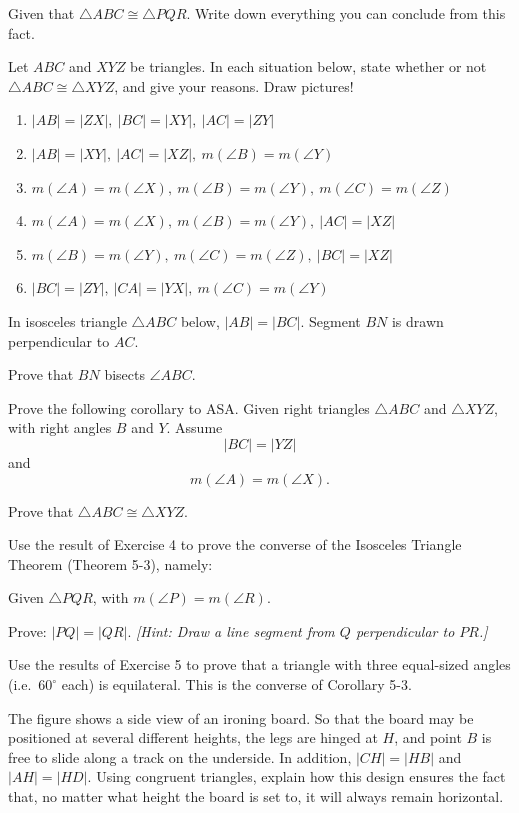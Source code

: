 \documentclass[12pt]{book} %
\begin{document}
\setcounter{Exercise}{0}
\begin{ExerciseList}
\Exercise Given that $\triangle ABC\cong\triangle PQR$. Write down everything you can conclude from this fact.

\Exercise Let $ABC$ and $XYZ$ be triangles. In each situation below, state whether or not $\triangle ABC\cong\triangle XYZ$, and give your reasons. Draw pictures!
\begin{enumerate}
\item[(a)] $|AB|=|ZX|,\ |BC|=|XY|,\ |AC|=|ZY|$
\item[(b)] $|AB|=|XY|,\ |AC|=|XZ|,\ m(\angle B)=m(\angle Y)$
\item[(c)] $m(\angle A)=m(\angle X),\ m(\angle B)=m(\angle Y),\ m(\angle C)=m(\angle Z)$
\item[(d)] $m(\angle A)=m(\angle X),\ m(\angle B)=m(\angle Y),\ |AC|=|XZ|$
\item[(e)] $m(\angle B)=m(\angle Y),\ m(\angle C)=m(\angle Z),\ |BC|=|XZ|$
\item[(f)] $|BC|=|ZY|,\ |CA|=|YX|,\ m(\angle C)=m(\angle Y)$
\end{enumerate}

\Exercise In isosceles triangle $\triangle ABC$ below, $|AB|=|BC|$. Segment $BN$ is drawn perpendicular to $AC$.


Prove that $BN$ bisects $\angle ABC$.

\Exercise Prove the following corollary to ASA. Given right triangles $\triangle ABC$ and $\triangle XYZ$, with right angles $B$ and $Y$. Assume
\[
|BC|=|YZ|
\]
and
\[
m(\angle A)=m(\angle X).
\]


Prove that $\triangle ABC\cong\triangle XYZ$.

\Exercise Use the result of Exercise 4 to prove the converse of the Isosceles Triangle Theorem (Theorem 5-3), namely:

Given $\triangle PQR$, with $m(\angle P)=m(\angle R)$.


Prove: $|PQ|=|QR|$. \textit{[Hint: Draw a line segment from $Q$ perpendicular to $PR$.]}

\Exercise Use the results of Exercise 5 to prove that a triangle with three equal-sized angles (i.e.\ $60^\circ$ each) is equilateral. This is the converse of Corollary 5-3.

\Exercise The figure shows a side view of an ironing board. So that the board may be positioned at several different heights, the legs are hinged at $H$, and point $B$ is free to slide along a track on the underside. In addition, $|CH|=|HB|$ and $|AH|=|HD|$. Using congruent triangles, explain how this design ensures the fact that, no matter what height the board is set to, it will always remain horizontal.


\end{ExerciseList}
\end{document}
